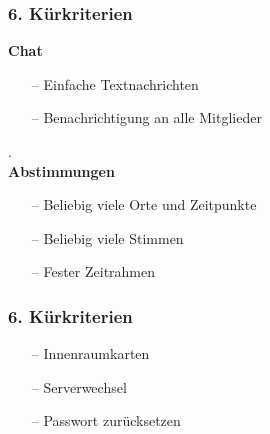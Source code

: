 \documentclass[aspectratio=1610]{beamer}
\begin{document}
\begin{frame}[plain]
\frametitle{6. Kürkriterien}
\begin{minipage}{0.5\textwidth}
	\setlength{\fboxsep}{0pt}%
	\setlength{\fboxrule}{1pt}%
	\captionsetup{labelformat=empty}
	\centering
\end{minipage}%
\begin{minipage}{0.5\textwidth}
	\textbf{Chat}
	\begin{itemize}
		\setlength\itemsep{0.3em}
		\item[--] Einfache Textnachrichten
		\item[--] Benachrichtigung an alle Mitglieder
	\end{itemize} 
.\\ \textbf{Abstimmungen}
\begin{itemize}
	\setlength\itemsep{0.3em}
	\item[--] Beliebig viele Orte und Zeitpunkte
	\item[--] Beliebig viele Stimmen
	\item[--] Fester Zeitrahmen
\end{itemize}
\end{minipage}
\end{frame}

\begin{frame}
	\frametitle{6. Kürkriterien}
	\begin{itemize}
		\setlength\itemsep{0.3em}
		\item[--] Innenraumkarten
		\item[--] Serverwechsel
		\item[--] Passwort zurücksetzen
	\end{itemize}
\end{frame}
\end{document}
